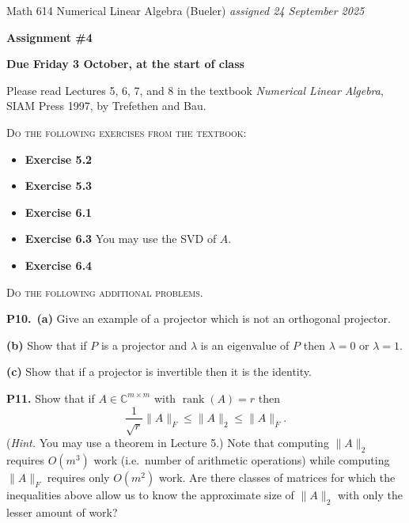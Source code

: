 \documentclass[12pt,dvipsnames]{amsart}
\newcommand{\CC}{\mathbb{C}}
\newcommand{\rank}{\operatorname{rank}}
\newcommand{\prob}[1]{\bigskip\noindent\textbf{#1.}\quad }
\newcommand{\epart}[1]{\medskip\noindent\textbf{(#1)}\quad }
\newcommand{\ppart}[1]{\,\textbf{(#1)}\quad }
\begin{document}
\scriptsize \noindent Math 614 Numerical Linear Algebra (Bueler) \hfill \emph{assigned 24 September 2025}
\normalsize\medskip

\Large\centerline{\textbf{Assignment \#4}}
\large
\medskip

\centerline{\textbf{Due Friday 3 October, at the start of class}}
\medskip
\normalsize

\thispagestyle{empty}

\bigskip

\noindent Please read Lectures 5, 6, 7, and 8 in the textbook \emph{Numerical Linear Algebra}, SIAM Press 1997, by Trefethen and Bau.

\bigskip
\noindent \textsc{Do the following exercises from the textbook}:

\begin{itemize}[itemsep=4pt]
\item \textbf{Exercise 5.2}
\item \textbf{Exercise 5.3}
\item \textbf{Exercise 6.1}
\item \textbf{Exercise 6.3} \quad You may use the SVD of $A$.
\item \textbf{Exercise 6.4}
\end{itemize}


\medskip
\noindent \textsc{Do the following additional problems.}

\prob{P10}  \ppart{a} Give an example of a projector which is not an orthogonal projector.

\epart{b} Show that if $P$ is a projector and $\lambda$ is an eigenvalue of $P$ then $\lambda = 0$ or $\lambda = 1$.

\epart{c} Show that if a projector is invertible then it is the identity.

\prob{P11}  Show that if $A\in \CC^{m\times m}$ with $\rank(A)=r$ then
  $$\frac{1}{\sqrt{r}} \|A\|_F \le \|A\|_2 \le \|A\|_F.$$
(\emph{Hint.}  You may use a theorem in Lecture 5.)  Note that computing $\|A\|_2$ requires $O(m^3)$ work (i.e.~number of arithmetic operations) while computing $\|A\|_F$ requires only $O(m^2)$ work.  Are there classes of matrices for which the inequalities above allow us to know the approximate size of $\|A\|_2$ with only the lesser amount of work?
\end{document}
